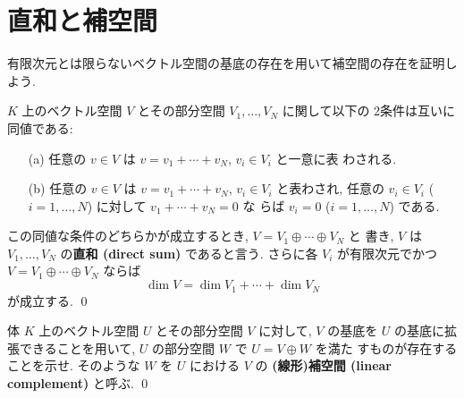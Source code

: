 \documentclass[12pt,twoside]{jarticle}
\newcommand\commentout[1]{#1}
\newcommand\commentout[1]{}
\begin{document}






\section{直和と補空間}

有限次元とは限らないベクトル空間の基底の存在を用いて補空間の存在を証明しよう.

\begin{question}[直和, 5点]
  $K$ 上のベクトル空間 $V$ とその部分空間 $V_1,\ldots,V_N$ に関して以下の
  2条件は互いに同値である:
  \begin{enumerate}
  \item[(a)] 任意の $v\in V$ は $v=v_1+\cdots+v_N$, $v_i\in V_i$ と一意に表
    わされる.
  \item[(b)] 任意の $v\in V$ は $v=v_1+\cdots+v_N$, $v_i\in V_i$ と表わされ,
    任意の $v_i\in V_i$ ($i=1,\ldots,N$) に対して $v_1+\cdots+v_N=0$ な
    らば $v_i=0$ ($i=1,\ldots,N$) である.
  \end{enumerate}
  この同値な条件のどちらかが成立するとき, $V=V_1\oplus\cdots\oplus V_N$ と
  書き, $V$ は $V_1,\ldots,V_N$ の{\bf 直和 (direct sum)} であると言う.
  さらに各 $V_i$ が有限次元でかつ $V=V_1\oplus\cdots\oplus V_N$ ならば
  \begin{equation*}
    \dim V = \dim V_1 + \cdots + \dim V_N
  \end{equation*}
  が成立する. \qed
\end{question}


\begin{question}[補空間の存在, 10点]
  \label{q:complement}
  体 $K$ 上のベクトル空間 $U$ とその部分空間 $V$ に対して, $V$ の基底を $U$ 
  の基底に拡張できることを用いて, $U$ の部分空間 $W$ で $U=V\oplus W$ を満た
  すものが存在することを示せ. 
  そのような $W$ を $U$ における $V$ の
  {\bf (線形)補空間 (linear complement)} と呼ぶ.
  \qed
\end{question}
\end{document}
